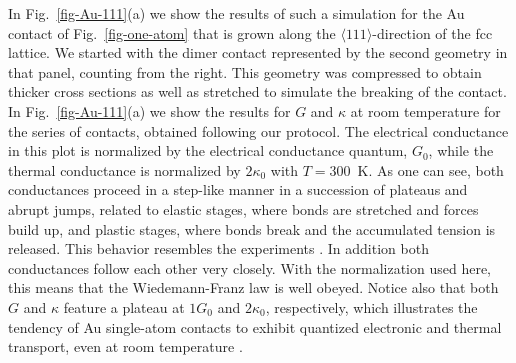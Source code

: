 \documentclass[aps,amsmath,amssymb,twocolumn,showpacs]{revtex4-1}
\begin{document}
In Fig.~\ref{fig-Au-111}(a) we show the results of such a
simulation for the Au contact of Fig.~\ref{fig-one-atom} that is grown along
the $\langle 111 \rangle$-direction of the fcc lattice. We started with the
dimer contact represented by the second geometry in that panel, counting
from the right. This geometry was compressed to obtain thicker cross
sections as well as stretched to simulate the breaking of the contact. In
Fig.~\ref{fig-Au-111}(a) we show the results for $G$ and $\kappa$ at room
temperature for the series of contacts, obtained following our protocol. The
electrical conductance in this plot is normalized by the electrical
conductance quantum, $G_0$, while the thermal conductance is normalized by
$2\kappa_0$ with $T=300$~K. As one can see, both conductances proceed in a
step-like manner in a succession of plateaus and abrupt jumps, related to
elastic stages, where bonds are stretched and forces build up, and plastic
stages, where bonds break and the accumulated tension is released. This
behavior resembles the experiments \cite{Cui2017}. In addition both
conductances follow each other very closely. With the normalization used here,
this means that the Wiedemann-Franz law is well obeyed. Notice also that both
$G$ and $\kappa$ feature a plateau at $1G_0$ and $2\kappa_0$, respectively,
which illustrates the tendency of Au single-atom contacts to exhibit quantized
electronic and thermal transport, even at room temperature \cite{Cui2017}.
\end{document}
